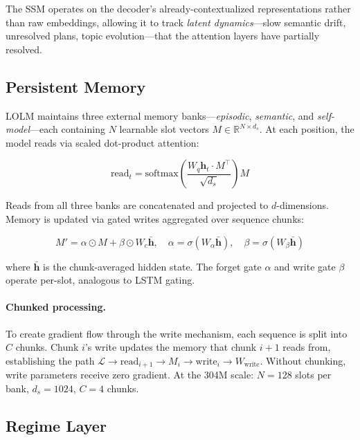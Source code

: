\documentclass{article}
\begin{document}
The SSM operates on the decoder's already-contextualized representations rather
than raw embeddings, allowing it to track \emph{latent dynamics}---slow semantic drift, unresolved plans, topic evolution---that the attention layers have partially resolved.

\subsection{Persistent Memory}
\label{sec:memory}

LOLM maintains three external memory banks---\emph{episodic}, \emph{semantic},
and \emph{self-model}---each containing $N$ learnable slot vectors
$M \in \mathbb{R}^{N \times d_s}$. At each position, the model reads via
scaled dot-product attention:

\begin{equation}
\text{read}_t = \text{softmax}\!\left(\frac{W_q \mathbf{h}_t \cdot M^\top}{\sqrt{d_s}}\right) M
\end{equation}

Reads from all three banks are concatenated and projected to $d$-dimensions.
Memory is updated via gated writes aggregated over sequence chunks:

\begin{equation}
M' = \alpha \odot M + \beta \odot W_c \bar{\mathbf{h}}, \quad
\alpha = \sigma(W_\alpha \bar{\mathbf{h}}), \quad
\beta = \sigma(W_\beta \bar{\mathbf{h}})
\end{equation}

where $\bar{\mathbf{h}}$ is the chunk-averaged hidden state. The forget gate
$\alpha$ and write gate $\beta$ operate per-slot, analogous to LSTM gating.

\paragraph{Chunked processing.} To create gradient flow through the write
mechanism, each sequence is split into $C$ chunks. Chunk $i$'s write updates
the memory that chunk $i{+}1$ reads from, establishing the path
$\mathcal{L} \to \text{read}_{i+1} \to M_i \to \text{write}_i \to W_\text{write}$.
Without chunking, write parameters receive zero gradient. At the 304M scale:
$N=128$ slots per bank, $d_s=1024$, $C=4$ chunks.

\subsection{Regime Layer}
\label{sec:regime}
\end{document}
